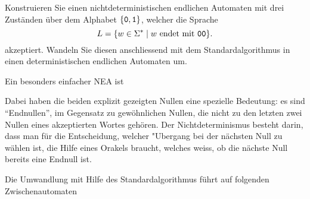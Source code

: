 Konstruieren Sie einen nichtdeterministischen endlichen Automaten
mit drei Zuständen
über dem Alphabet $\{{\tt 0},{\tt 1}\}$, welcher die Sprache
\[
L=\{w\in\Sigma^*\mid \text{$w$ endet mit {\tt 00}}\}.
\]
akzeptiert.
Wandeln Sie diesen anschliessend mit dem Standardalgorithmus
in einen deterministischen endlichen Automaten um.


\begin{loesung}
\def\zustand#1#2{
	\draw #1 circle[radius=0.4];
	\node at #1 {#2};
}
\def\akzeptierzustand#1#2{
	\draw #1 circle[radius=0.34];
	\zustand{#1}{#2}
}
\def\pfeil#1#2{
	\draw[->,shorten >= 0.4cm,shorten <= 0.4cm] #1 -- #2;
}
Ein besonders einfacher NEA ist
\begin{center}
\end{center}
Dabei haben die beiden explizit gezeigten Nullen eine spezielle
Bedeutung: es sind ``Endnullen'', im Gegensatz zu gewöhnlichen
Nullen, die nicht zu den letzten zwei Nullen eines akzeptierten Wortes
gehören.
Der Nichtdeterminismus besteht darin, dass man für die
Entscheidung, welcher "Ubergang bei der nächsten Null zu wählen
ist, die Hilfe eines Orakels braucht, welches weiss, ob die
nächste Null bereits eine Endnull ist.

Die Umwandlung mit Hilfe des Standardalgorithmus führt auf folgenden
Zwischenautomaten
\begin{center}
\end{center}
\end{loesung}
